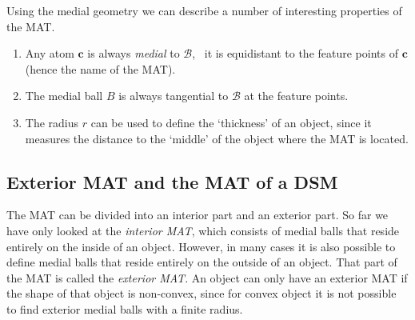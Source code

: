 Using the medial geometry we can describe a number of interesting properties of the MAT\@.
\begin{enumerate}
	\item Any atom $\mathbf{c}$ is always \emph{medial} to $\mathcal{B}$, \ie\ it is equidistant to the feature points of $\mathbf{c}$ (hence the name of the MAT).
	\item The medial ball $B$ is always tangential to $\mathcal{B}$ at the feature points. 
	\item The radius $r$ can be used to define the `thickness' of an object, since it measures the distance to the `middle' of the object where the MAT is located.
\end{enumerate}

\subsection{Exterior MAT and the MAT of a DSM}
The MAT can be divided into an interior part and an exterior part.
So far we have only looked at the \emph{interior MAT}, which consists of medial balls that reside entirely on the inside of an object.
However, in many cases it is also possible to define medial balls that reside entirely on the outside of an object.
That part of the MAT is called the \emph{exterior MAT}.
An object can only have an exterior MAT if the shape of that object is non-convex, since for convex object it is not possible to find exterior medial balls with a finite radius.

